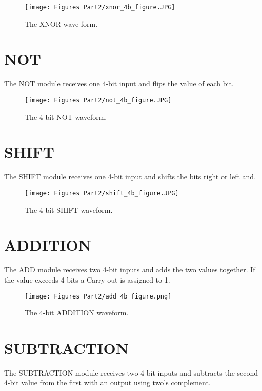 \documentclass[
	letterpaper, %
	10pt, %
]{CSUniSchoolLabReport}
\begin{document}
\begin{figure}[H] %
	\texttt{[image: Figures Part2/xnor\_4b\_figure.JPG]} %
	\caption{The XNOR wave form.}
\end{figure}


\section{NOT}
The NOT module receives one 4-bit input and flips the value of each bit. 

\begin{figure}[H] %
	\texttt{[image: Figures Part2/not\_4b\_figure.JPG]} %
	\caption{The 4-bit NOT waveform.}
\end{figure}


\section{SHIFT}
The SHIFT module receives one 4-bit input and shifts the bits right or left and. 

\begin{figure}[H] %
	\texttt{[image: Figures Part2/shift\_4b\_figure.JPG]} %
	\caption{The 4-bit SHIFT waveform.}
\end{figure}


\section{ADDITION}
The ADD module receives two 4-bit inputs and adds the two values together. If the value exceeds 4-bits a Carry-out is assigned to 1.

\begin{figure}[H] %
	\texttt{[image: Figures Part2/add\_4b\_figure.png]} %
	\caption{The 4-bit ADDITION waveform.}
\end{figure}

\section{SUBTRACTION}
The SUBTRACTION module receives two 4-bit inputs and subtracts the second 4-bit value from the first with an output using two's complement. 
\end{document}
